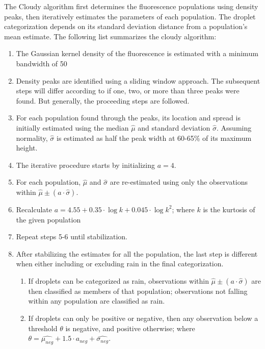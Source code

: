 The Cloudy algorithm first determines the fluorescence populations using density peaks, then iteratively estimates the parameters of each population. The droplet categorization depends on its standard deviation distance from a population's mean estimate. The following list summarizes the cloudy algorithm:
\begin{enumerate}
    \item The Gaussian kernel density of the fluorescence is estimated with a minimum bandwidth of 50
    \item Density peaks are identified using a sliding window approach. The subsequent steps will differ according to if one, two, or more than three peaks were found.  But generally, the proceeding steps are followed.
    \item For each population found through the peaks, its location and spread is initially estimated using the median \(\hat{\mu}\) and standard deviation \(\hat{\sigma}\). Assuming normality, \(\hat{\sigma}\) is estimated as half the peak width at 60-65\% of its maximum height.
    \item The iterative procedure starts by initializing \(a=4\).
    \item For each population, \(\hat{\mu}\) and \(\hat{\sigma}\) are re-estimated using only the observations within \(\hat{\mu} \pm (a \cdot \hat{\sigma})\).
    \item Recalculate \(a=4.55 + 0.35 \cdot \log{k} + 0.045 \cdot \log{k}^2\); where \(k\) is the kurtosis of the given population
    \item Repeat steps 5-6 until stabilization.
    \item After stabilizing the estimates for all the population, the last step is different when either including or excluding rain in the final categorization. 
    \begin{enumerate}
        \item If droplets can be categorized as rain, observations within \(\hat{\mu} \pm (a \cdot \hat{\sigma})\) are then classified as members of that population; observations not falling within any population are classified as rain.
        \item If droplets can only be positive or negative, then any observation below a threshold \(\theta\) is negative, and positive otherwise; where \(\theta=\hat{\mu_{neg}} + 1.5 \cdot a_{neg} + \hat{\sigma_{neg}}\).
    \end{enumerate}
\end{enumerate}

